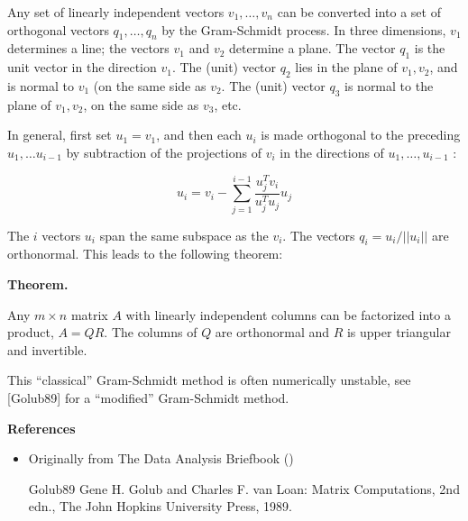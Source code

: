 \documentclass[12pt]{article}
\begin{document}
Any set of linearly independent vectors $v_1,\ldots,v_n$ can be converted into a set of orthogonal vectors $q_1,\ldots,q_n$ by the Gram-Schmidt process. In three dimensions, $v_1$ determines a line; the vectors $v_1$ and $v_2$ determine a plane. The vector $q_1$ is the unit vector in the direction $v_1$. The (unit) vector $q_2$ lies in the plane of $v_1, v_2$, and is normal to $v_1$ (on the same side as $v_2$. The (unit) vector $q_3$ is normal to the plane of $v_1, v_2$, on the same side as $v_3$, etc.

In general, first set $u_1 = v_1$, and then each $u_i$ is made orthogonal to the preceding $u_1,\ldots u_{i-1}$ by subtraction of the projections of $v_i$ in the directions of $u_1,\ldots,u_{i-1}$ :

$$ u_i = v_i - \sum_{j=1}^{i-1} \frac{u_j^Tv_i}{u_j^Tu_j} u_j$$

The $i$ vectors $u_i$ span the same subspace as the $v_i$. The vectors $q_i=u_i/||u_i||$ are orthonormal. This leads to the following theorem:

{\bf Theorem.}

Any $m \times n$ matrix $A$ with linearly independent columns can be factorized into a product, $A = QR$. The columns of $Q$ are orthonormal and $R$ is upper triangular and invertible.

This ``classical'' Gram-Schmidt method is often numerically unstable, see [Golub89] for a ``modified'' Gram-Schmidt method.

{\bf References}

\begin{itemize}
\item Originally from The Data Analysis Briefbook
()
\end{itemize}

\begin{itemize}
\item[Golub89] Gene H. Golub and Charles F. van Loan: Matrix Computations, 2nd edn., The John Hopkins University Press, 1989.
\end{itemize}
\end{document}
